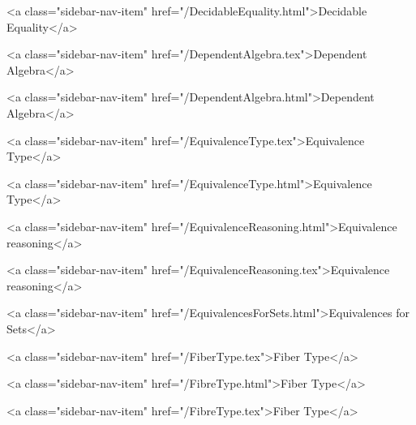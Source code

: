      
        
          <a class="sidebar-nav-item" href="/DecidableEquality.html">Decidable Equality</a>
        
      
    
      
        
          <a class="sidebar-nav-item" href="/DependentAlgebra.tex">Dependent Algebra</a>
        
      
    
      
        
          <a class="sidebar-nav-item" href="/DependentAlgebra.html">Dependent Algebra</a>
        
      
    
      
        
          <a class="sidebar-nav-item" href="/EquivalenceType.tex">Equivalence Type</a>
        
      
    
      
        
          <a class="sidebar-nav-item" href="/EquivalenceType.html">Equivalence Type</a>
        
      
    
      
        
          <a class="sidebar-nav-item" href="/EquivalenceReasoning.html">Equivalence reasoning</a>
        
      
    
      
        
          <a class="sidebar-nav-item" href="/EquivalenceReasoning.tex">Equivalence reasoning</a>
        
      
    
      
        
          <a class="sidebar-nav-item" href="/EquivalencesForSets.html">Equivalences for Sets</a>
        
      
    
      
        
          <a class="sidebar-nav-item" href="/FiberType.tex">Fiber Type</a>
        
      
    
      
        
          <a class="sidebar-nav-item" href="/FibreType.html">Fiber Type</a>
        
      
    
      
        
          <a class="sidebar-nav-item" href="/FibreType.tex">Fiber Type</a>
        
